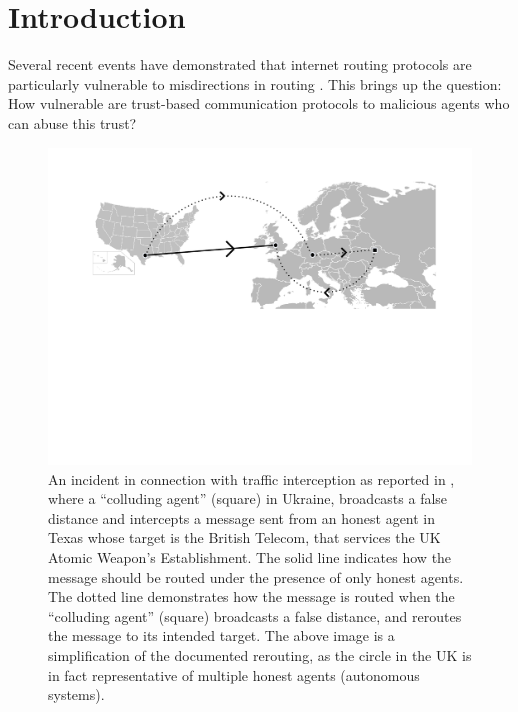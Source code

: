 \documentclass{comnet}
\begin{document}
\section{Introduction}
Several recent events have demonstrated that internet routing protocols are
particularly vulnerable to misdirections in routing \cite{GormanV13, JimCowie,
Madory, Goodin}. This brings up the question: How vulnerable are trust-based
communication protocols to malicious agents who can abuse this trust?

\begin{figure}
\centering
\includegraphics[width=1 \textwidth]{images/BGP4}
\caption{An incident in connection with traffic interception as reported in
\cite{Madory}, where a ``colluding agent'' (square) in Ukraine, broadcasts a
false distance and intercepts a message sent from an honest agent in Texas
whose target is the British Telecom, that services the UK Atomic Weapon's
Establishment. The solid line indicates how the message should be routed under
the presence of only honest agents.  The dotted line demonstrates how the
message is routed when the ``colluding agent'' (square) broadcasts a false
distance, and reroutes the message to its intended target.  The above image is
a simplification of the documented rerouting, as the circle in the UK is in
fact representative of multiple honest agents (autonomous systems).}
\label{fig:rerout} \end{figure}
\end{document}
